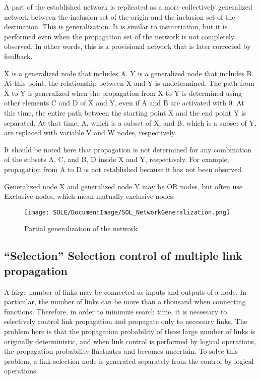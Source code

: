 \documentclass[12pt]{article}
\begin{document}
A part of the established network is replicated as a more collectively
generalized network between the inclusion set of the origin and the
inclusion set of the destination. This is generalization. It is similar
to instantiation, but it is performed even when the propagation set of
the network is not completely observed. In other words, this is a
provisional network that is later corrected by feedback.

X is a generalized node that includes A. Y is a generalized node that
includes B. At this point, the relationship between X and Y is
undetermined. The path from X to Y is generalized when the propagation
from X to Y is determined using other elements C and D of X and Y, even
if A and B are activated with 0. At this time, the entire path between
the starting point X and the end point Y is separated. At that time, A,
which is a subset of X, and B, which is a subset of Y, are replaced with
variable V and W nodes, respectively.

It should be noted here that propagation is not determined for any
combination of the subsets A, C, and B, D inside X and Y, respectively.
For example, propagation from A to D is not established because it has
not been observed.

Generalized node X and generalized node Y may be OR nodes, but often use
Exclusive nodes, which mean mutually exclusive nodes.

\begin{figure}[ht]
  \centering
  \texttt{[image: SOLE/DocumentImage/SOL\_NetworkGeneralization.png]}
  \caption{Partial generalization of the network}
  \label{fig:partial_generalization_of_the_network}
\end{figure}

\subsection{``Selection'' Selection control of multiple link
propagation}\label{selection-selection-control-of-multiple-link-propagation}

A large number of links may be connected as inputs and outputs of a
node. In particular, the number of links can be more than a thousand
when connecting functions. Therefore, in order to minimize search time,
it is necessary to selectively control link propagation and propagate
only to necessary links. The problem here is that the propagation
probability of these large number of links is originally deterministic,
and when link control is performed by logical operations, the
propagation probability fluctuates and becomes uncertain. To solve this
problem, a link selection node is generated separately from the control
by logical operations.
\end{document}
